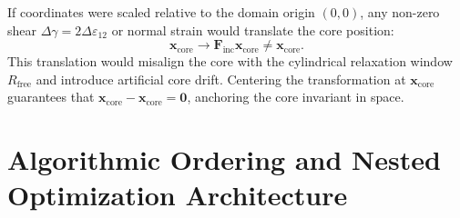 \documentclass[11pt,a4paper]{article}
\begin{document}
\begin{infobox}
If coordinates were scaled relative to the domain origin $(0, 0)$, any non-zero shear $\Delta\gamma = 2\Delta\varepsilon_{12}$ or normal strain would translate the core position:
$$\mathbf{x}_{\text{core}} \longrightarrow \mathbf{F}_{\text{inc}} \mathbf{x}_{\text{core}} \ne \mathbf{x}_{\text{core}}.$$
This translation would misalign the core with the cylindrical relaxation window $R_{\text{free}}$ and introduce artificial core drift. Centering the transformation at $\mathbf{x}_{\text{core}}$ guarantees that $\mathbf{x}_{\text{core}} - \mathbf{x}_{\text{core}} = \mathbf{0}$, anchoring the core invariant in space.
\end{infobox}

\section{Algorithmic Ordering and Nested Optimization Architecture}
\end{document}
